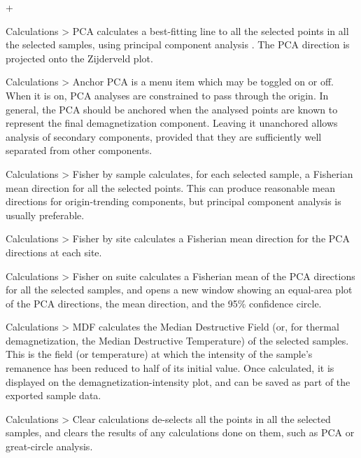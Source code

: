 \documentclass[a4paper,british]{article}
\newcommand{\menuitemlabel}[1]{%
\mbox{\textsf{#1}}\hfil}
\newenvironment{menuitemlist}%
{\begin{list}{}{%
\renewcommand{\makelabel}{\menuitemlabel}%
\setlength{\labelwidth}{35pt}%
\setlength{\leftmargin}%
             {\labelwidth+\labelsep}}}%
{\end{list}}
\newcommand{\caps}[1]{\MakeTextUppercase{#1}} %
\newcommand{\submenu}{ \textgreater{} } %
\begin{document}
\begin{menuitemlist}

\item[Calculations\submenu PCA] calculates a best-fitting line to all the
  selected points in all the selected samples, using principal component
  analysis \citep{kirschvink1980least}. The \caps{pca} direction is projected
  onto the Zijderveld plot.

\item[Calculations\submenu Anchor PCA] is a menu item which may be toggled on
  or off. When it is on, \caps{pca} analyses are constrained to pass through
  the origin. In general, the \caps{pca} should be anchored when the analysed
  points are known to represent the final demagnetization component. Leaving
  it unanchored allows analysis of secondary components, provided that they
  are sufficiently well separated from other components.

\item[Calculations\submenu Fisher by sample] calculates, for each selected
  sample, a Fisherian mean direction for all the selected points. This can
  produce reasonable mean directions for origin-trending components, but
  principal component analysis is usually preferable.

\item[Calculations\submenu Fisher by site] calculates a Fisherian mean
  direction for the \caps{pca} directions at each site.

\item[Calculations\submenu Fisher on suite] calculates a Fisherian mean of
  the \caps{pca} directions for all the selected samples, and opens a new
  window showing an equal-area plot of the \caps{pca} directions, the mean
  direction, and the 95\% confidence circle.

\item[Calculations\submenu MDF] calculates the Median Destructive Field (or,
  for thermal demagnetization, the Median Destructive Temperature) of the
  selected samples. This is the field (or temperature) at which the intensity
  of the sample's remanence has been reduced to half of its initial value.
  Once calculated, it is displayed on the demagnetization-intensity plot, and
  can be saved as part of the exported sample data.

\item[Calculations\submenu Clear calculations] de-selects all the points
in all the selected samples, and clears the results of any calculations done
on them, such as \caps{pca} or great-circle analysis.


\end{menuitemlist}
\end{document}
